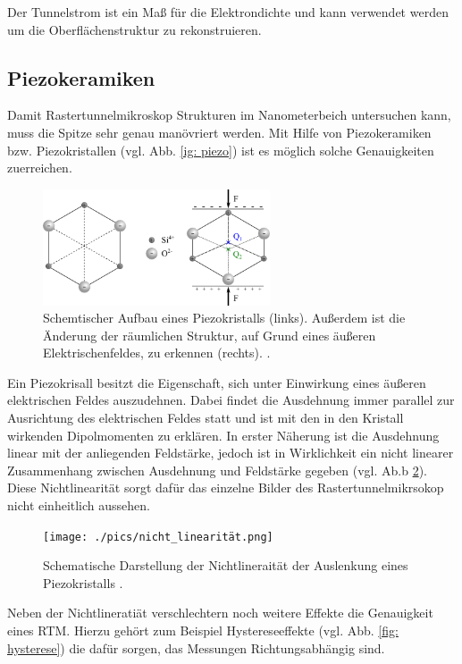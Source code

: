 Der Tunnelstrom ist ein Maß für die Elektrondichte und kann verwendet werden um die Oberflächenstruktur
zu rekonstruieren.

\subsection{Piezokeramiken}
Damit Rastertunnelmikroskop Strukturen im Nanometerbeich untersuchen kann, muss
die Spitze sehr genau manövriert werden. Mit Hilfe von Piezokeramiken bzw.
Piezokristallen (vgl. Abb. \ref{ig: piezo}) ist es möglich solche Genauigkeiten zuerreichen.
\begin{figure}[h]
  \centering
  \includegraphics[width=0.6\textwidth]{./pics/piezo.png}
  \caption{Schemtischer Aufbau eines Piezokristalls (links). Außerdem ist die Änderung der räumlichen Struktur, auf Grund eines
  äußeren Elektrischenfeldes, zu erkennen (rechts). \cite{piezo}.}
  \label{fig: piezo}
\end{figure}
Ein Piezokrisall besitzt die Eigenschaft, sich unter Einwirkung eines äußeren
elektrischen Feldes auszudehnen. Dabei findet die Ausdehnung immer parallel zur
Ausrichtung des elektrischen Feldes statt und ist mit den in den Kristall wirkenden
Dipolmomenten zu erklären. In erster Näherung ist die Ausdehnung linear mit der anliegenden Feldstärke,
jedoch ist in Wirklichkeit ein nicht linearer Zusammenhang zwischen Ausdehnung und Feldstärke
gegeben (vgl. Ab.b \ref{fig: non_linear}). Diese Nichtlinearität sorgt dafür das einzelne Bilder des
Rastertunnelmikrsokop nicht einheitlich aussehen.
\begin{figure}[h]
  \centering
  \texttt{[image: ./pics/nicht\_linearität.png]}
  \caption{Schematische Darstellung der Nichtlineraität der Auslenkung eines Piezokristalls \cite{rtm}.}
  \label{fig: non_linear}
\end{figure}
Neben der Nichtlineratiät verschlechtern noch weitere
Effekte die Genauigkeit eines RTM. Hierzu gehört zum Beispiel Hystereseeffekte (vgl. Abb. \ref{fig: hysterese}) die dafür sorgen,
das Messungen Richtungsabhängig sind.
